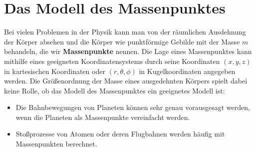 \section{Das Modell des Massenpunktes}\label{sec: Modell_Massenpunkt}
Bei vielen Problemen in der Physik kann man von der räumlichen Ausdehnung der Körper absehen und die Körper wie punktförmige Gebilde mit der Masse $m$ behandeln, die wir \textbf{Massenpunkte} nennen. Die Lage eines Massenpunktes kann mithilfe eines geeigneten Koordinatensystems durch seine Koordinaten $(x, y, z)$ in kartesischen Koordinaten oder $(r, \theta, \phi)$ in Kugelkoordinaten angegeben werden. 
Die Größenordnung der Masse eines ausgedehnten Körpers spielt dabei keine Rolle, ob das Modell des Massenpunktes ein geeignetes Modell ist: 
\begin{itemize}
    \item Die Bahnbewegungen von Planeten können sehr genau vorausgesagt werden, wenn die Planeten als Massenpunkte vereinfacht werden. 
    \item Stoßprozesse von Atomen oder deren Flugbahnen werden häufig mit Massenpunkten berechnet.
\end{itemize}

